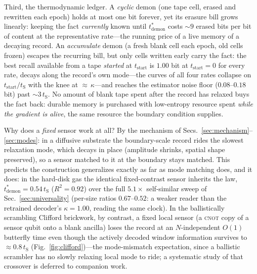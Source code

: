 \documentclass[aps,pre,twocolumn,superscriptaddress,nofootinbib,longbibliography]{revtex4-2}
\newcommand{\tS}{t_{\mathrm{S}}}
\newcommand{\tstar}{t^{*}}
\newcommand{\kap}{\kappa}
\begin{document}
Third, the thermodynamic ledger. A \emph{cyclic} demon (one tape cell, erased and rewritten
each epoch) holds at most one bit forever, yet its erasure bill grows linearly: keeping the
fact \emph{currently} known until $\tstar_{\mathrm{demon}}$ costs $\sim9$ erased bits per
bit of content at the representative rate---the running price of a live memory of a
decaying record. An \emph{accumulate} demon (a fresh blank cell each epoch, old cells
frozen) escapes the recurring bill, but only cells written early carry the fact: the best
recall available from a tape \emph{started} at $t_{\mathrm{start}}$ is $1.00$ bit at
$t_{\mathrm{start}}=0$ for every rate, decays along the record's own mode---the curves of
all four rates collapse on $t_{\mathrm{start}}/\tS$ with the knee at ${\approx}\,\kap$---and
reaches the estimator noise floor ($0.08$--$0.18$ bit) past ${\sim}3\,\tS$. No amount of
blank tape spent after the record has relaxed buys the fact back: durable memory is
purchased with low-entropy resource spent \emph{while the gradient is alive}, the same
resource the boundary condition supplies.

Why does a \emph{fixed} sensor work at all? By the mechanism of
Secs.~\ref{sec:mechanism}--\ref{sec:modes}: in a diffusive substrate the boundary-scale
record rides the slowest relaxation mode, which decays in place (amplitude shrinks, spatial
shape preserved), so a sensor matched to it at the boundary stays matched. This predicts
the construction generalizes exactly as far as mode matching does, and it does: in the
hard-disk gas the identical fixed-contrast sensor inherits the law,
$\tstar_{\mathrm{demon}}=0.54\,\tS$ ($R^2=0.92$) over the full $5.1\times$ self-similar
sweep of Sec.~\ref{sec:universality} (per-size ratios $0.67$--$0.52$: a weaker reader than
the retrained decoder's $\kap=1.00$, reading the same clock). In the ballistically
scrambling Clifford brickwork, by contrast, a fixed local sensor (a \textsc{cnot} copy of a
sensor qubit onto a blank ancilla) loses the record at an $N$-independent $O(1)$ butterfly
time even though the actively decoded window information survives to ${\approx}0.8\,\tS$
(Fig.~\ref{fig:clifford})---the mode-mismatch expectation, since a ballistic scrambler has
no slowly relaxing local mode to ride; a systematic study of that crossover is deferred to
companion work.
\end{document}
